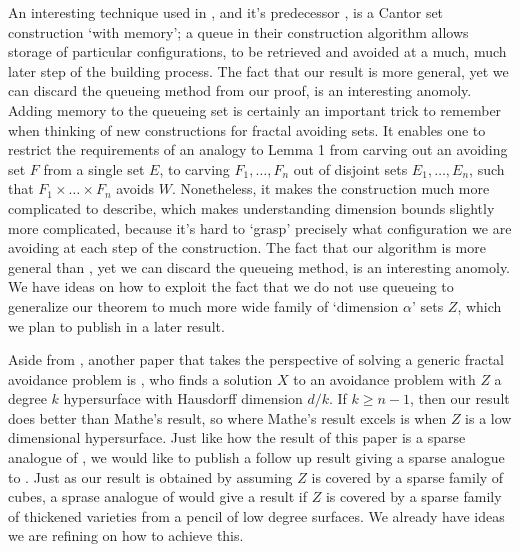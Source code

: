 \documentclass{article}
\theoremstyle{plain}
\theoremstyle{plain}
\begin{document}
An interesting technique used in \cite{MalabikaRob}, and it's predecessor \cite{KeletiDimOneSet}, is a Cantor set construction `with memory'; a queue in their construction algorithm allows storage of particular configurations, to be retrieved and avoided at a much, much later step of the building process. The fact that our result is more general, yet we can discard the queueing method from our proof, is an interesting anomoly. Adding memory to the queueing set is certainly an important trick to remember when thinking of new constructions for fractal avoiding sets. It enables one to restrict the requirements of an analogy to Lemma 1 from carving out an avoiding set $F$ from a single set $E$, to carving $F_1, \dots, F_n$ out of disjoint sets $E_1, \dots, E_n$, such that $F_1 \times \dots \times F_n$ avoids $W$. Nonetheless, it makes the construction much more complicated to describe, which makes understanding dimension bounds slightly more complicated, because it's hard to `grasp' precisely what configuration we are avoiding at each step of the construction. The fact that our algorithm is more general than \cite{MalabikaRob}, yet we can discard the queueing method, is an interesting anomoly. We have ideas on how to exploit the fact that we do not use queueing to generalize our theorem to much more wide family of `dimension $\alpha$' sets $Z$, which we plan to publish in a later result.

Aside from \cite{MalabikaRob}, another paper that takes the perspective of solving a generic fractal avoidance problem is \cite{Mathe}, who finds a solution $X$ to an avoidance problem with $Z$ a degree $k$ hypersurface with Hausdorff dimension $d/k$. If $k \geq n-1$, then our result does better than Mathe's result, so where Mathe's result excels is when $Z$ is a low dimensional hypersurface. Just like how the result of this paper is a sparse analogue of \cite{MalabikaRob}, we would like to publish a follow up result giving a sparse analogue to \cite{Mathe}. Just as our result is obtained by assuming $Z$ is covered by a sparse family of cubes, a sprase analogue of \cite{Mathe} would give a result if $Z$ is covered by a sparse family of thickened varieties from a pencil of low degree surfaces. We already have ideas we are refining on how to achieve this.
\end{document}
